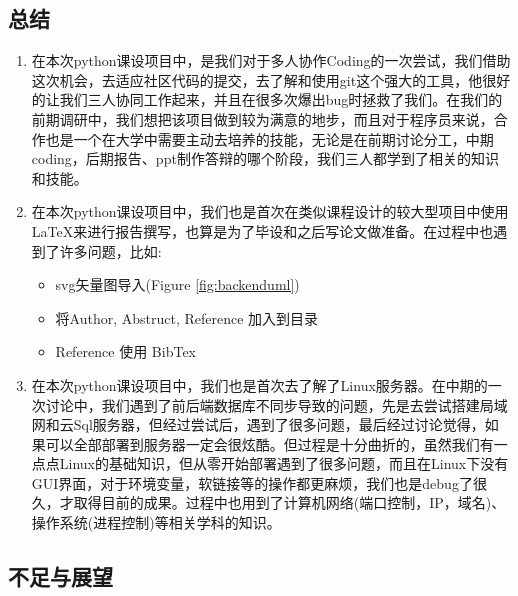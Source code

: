 \documentclass[twoside,11pt]{article}
\begin{document}
\subsection{总结}
\begin{enumerate}
    \item 在本次python课设项目中，是我们对于多人协作Coding的一次尝试，我们借助这次机会，去适应社区代码的提交，去了解和使用git这个强大的工具，他很好的让我们三人协同工作起来，并且在很多次爆出bug时拯救了我们。在我们的前期调研中，我们想把该项目做到较为满意的地步，而且对于程序员来说，合作也是一个在大学中需要主动去培养的技能，无论是在前期讨论分工，中期coding，后期报告、ppt制作答辩的哪个阶段，我们三人都学到了相关的知识和技能。
    \item 在本次python课设项目中，我们也是首次在类似课程设计的较大型项目中使用\LaTeX{}来进行报告撰写，也算是为了毕设和之后写论文做准备。在过程中也遇到了许多问题，比如:
          \begin{itemize}
              \item svg矢量图导入(Figure \ref{fig:backenduml})
              \item 将Author, Abstruct, Reference 加入到目录
              \item Reference 使用 BibTex
          \end{itemize}
    \item 在本次python课设项目中，我们也是首次去了解了Linux服务器。在中期的一次讨论中，我们遇到了前后端数据库不同步导致的问题，先是去尝试搭建局域网和云Sql服务器，但经过尝试后，遇到了很多问题，最后经过讨论觉得，如果可以全部部署到服务器一定会很炫酷。但过程是十分曲折的，虽然我们有一点点Linux的基础知识，但从零开始部署遇到了很多问题，而且在Linux下没有GUI界面，对于环境变量，软链接等的操作都更麻烦，我们也是debug了很久，才取得目前的成果。过程中也用到了计算机网络(端口控制，IP，域名)、操作系统(进程控制)等相关学科的知识。

\end{enumerate}
\subsection{不足与展望}
\end{document}
